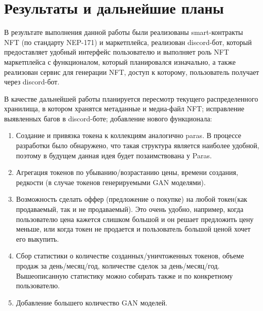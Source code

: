 \section{Результаты и дальнейшие планы}
\label{section.output}
В результате выполнения данной работы были реализованы smart-контракты NFT (по стандарту NEP-171) и маркетплейса, реализован discord-бот, который предоставляет удобный интерфейс пользователю и выполняет роль NFT маркетплейса с функционалом, который планировался изначально, а также реализован сервис для генерации NFT, доступ к которому, пользователь получает через discord-бот.

В качестве дальнейшей работы планируется пересмотр текущего распределенного хранилища, в котором хранятся метаданные и медиа-файл NFT; исправление выявленных багов в discord-боте; добавление нового функционала:
\begin{enumerate}
    \item Создание и привязка токена к коллекциям аналогично paras. В процессе разработки было обнаружено, что такая структура является наиболее удобной, поэтому в будущем данная идея будет позаимствована у Paras.
    \item Агрегация токенов по убыванию/возрастанию цены, времени создания, редкости (в случае токенов генерируемыми GAN моделями).
    \item Возможность сделать оффер (предложение о покупке) на любой токен(как продаваемый, так и не продаваемый). Это очень удобно, например, когда пользователю цена кажется слишком большой и он решает предложить цену меньше, или когда токен не продается и пользователь большой ценой хочет его выкупить.
    \item Сбор статистики о количестве созданных/уничтоженных токенов, объеме продаж за день/месяц/год, количестве сделок за день/месяц/год. Вышеописанную статистику можно собирать также и по конкретному пользователю.
    \item Добавление большего количество GAN моделей.
\end{enumerate}

\newpage
